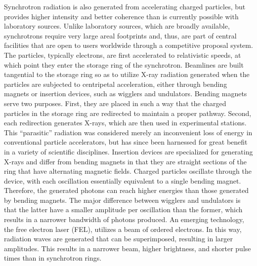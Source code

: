 \documentclass[journal=cmatex,manuscript=perspective]{achemso}
\begin{document}
Synchrotron radiation is also generated from accelerating charged
particles, but provides higher intensity and better coherence than is
currently possible with laboratory sources. Unlike laboratory sources,
which are broadly available, synchrotrons require very large areal
footprints and, thus, are part of central facilities that are open to
users worldwide through a competitive proposal system. The particles,
typically electrons, are first accelerated to relativistic speeds, at
which point they enter the storage ring of the synchrotron. Beamlines
are built tangential to the storage ring so as to utilize X-ray
radiation generated when the particles are subjected to centripetal
acceleration, either through bending magnets or insertion devices,
such as wigglers and undulators. Bending magnets serve two
purposes. First, they are placed in such a way that the charged
particles in the storage ring are redirected to maintain a proper
pathway. Second, each redirection generates X-rays, which are then
used in experimental stations. This ``parasitic'' radiation was
considered merely an inconvenient loss of energy in conventional
particle accelerators, but has since been harnessed for great benefit
in a variety of scientific disciplines. Insertion devices are
specialized for generating X-rays and differ from bending magnets in
that they are straight sections of the ring that have alternating
magnetic fields. Charged particles oscillate through the device, with
each oscillation essentially equivalent to a single bending
magnet. Therefore, the generated photons can reach higher energies
than those generated by bending magnets. The major difference between
wigglers and undulators is that the latter have a smaller amplitude
per oscillation than the former, which results in a narrower bandwidth
of photons produced. An emerging technology, the free electron laser
(FEL), utilizes a beam of ordered electrons. In this way, radiation
waves are generated that can be superimposed, resulting in larger
amplitudes. This results in a narrower beam, higher brightness, and
shorter pulse times than in synchrotron
rings\cite{synchrotronradiation}.
\end{document}

